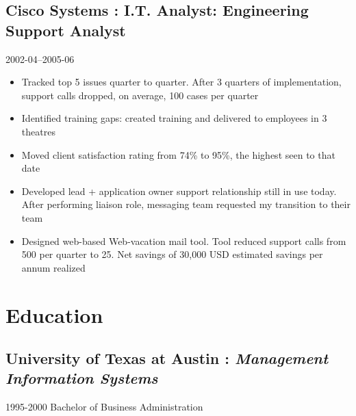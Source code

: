 \documentclass[]{article}
\begin{document}
\subsection*{Cisco Systems : I.T. Analyst: Engineering Support Analyst}
  \label{ciscosystems_rdfa_cisco_2_title:_rdfa_cisco_2_desc}
  2002-04--2005-06
\begin{itemize}
    \item{Tracked top 5 issues quarter to quarter. After 3 quarters of implementation, support calls dropped, on average, 100 cases per quarter}
    \item{Identified training gaps: created training and delivered to employees in 3 theatres}
    \item{Moved client satisfaction rating from 74{\%} to 95{\%}, the highest seen to that date}
    \item{Developed lead + application owner support relationship still in use today. After performing liaison role, messaging team requested my transition to their team}
    \item{Designed web-based Web-vacation mail tool. Tool reduced support calls from 500 per quarter to 25. Net savings of 30,000 USD estimated savings per annum realized
}
\end{itemize}
       


























\section*{Education}


	\subsection*{\textbf{University of Texas at Austin} : \textit{Management Information Systems}}
  \label{_universityoftexasataustin_managementinformationsystems}
  \textsf{1995-2000}
\vspace{0.02in}
Bachelor of Business Administration\\
\end{document}
